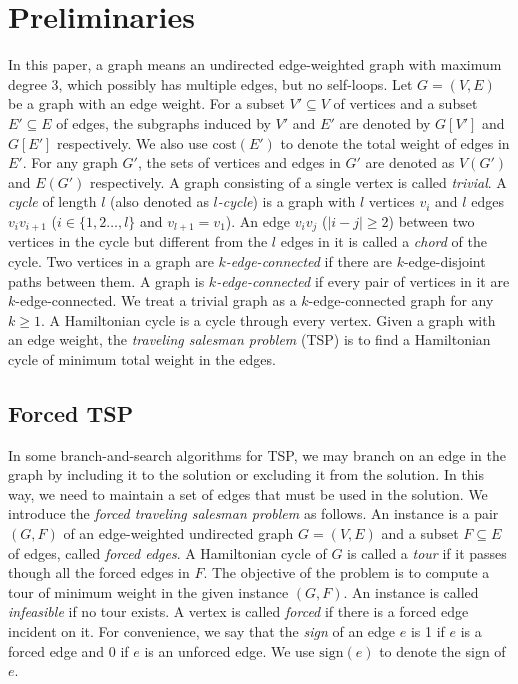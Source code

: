 \documentclass[runningheads]{llncs}
\begin{document}
\section{Preliminaries}\label{sec:prelim}

In this paper, a graph means an undirected edge-weighted graph with maximum degree 3,
which possibly has multiple edges, but no self-loops.
Let $G=(V,E)$ be a graph with an edge weight.
For a subset $V'\subseteq V$ of vertices and a subset $E'\subseteq E$ of edges,
the subgraphs induced by $V'$ and $E'$ are denoted by $G[V']$ and $G[E']$ respectively. We also use  $\mathrm{cost}(E')$ to denote the total weight of edges in $E'$.
For any graph $G'$, the sets of vertices
and edges in $G'$ are denoted as $V(G')$ and $E(G')$ respectively.
A graph consisting of a single vertex is called {\em trivial}.
A \emph{cycle} of length $l$ (also denoted as {\em $l$-cycle}) is a graph with $l$ vertices $v_i$ and $l$ edges $v_iv_{i+1}$ ($i\in \{1,2\dots,l\}$ and $v_{l+1}=v_1$). An edge $v_iv_j$ ($|i-j|\geq 2$) between two vertices in the cycle but different from the $l$ edges in it
is called a {\em chord} of the cycle.
Two vertices in a graph are
{\em $k$-edge-connected} if there are $k$-edge-disjoint paths between them. A graph is {\em $k$-edge-connected} if every pair of vertices in it are $k$-edge-connected.
We treat a trivial graph as a $k$-edge-connected graph for any $k\geq 1$.
A Hamiltonian cycle is a cycle through every vertex. Given a graph with an edge weight,
the \emph{traveling salesman problem} (TSP) is to find a Hamiltonian cycle of minimum total weight in the edges.

\subsection{Forced TSP}
In some branch-and-search algorithms for TSP, we may branch on an edge in the graph by including it to the solution
or excluding it from the solution. In this way, we need to maintain a set of edges that must be used in the solution.
We introduce the \emph{forced traveling salesman problem} as follows. An instance is a pair $(G,F)$ of an edge-weighted undirected graph
$G=(V,E)$ and
a subset $F\subseteq E$ of edges, called {\em forced edges}.
A Hamiltonian cycle of $G$ is called a {\em tour}
if it passes though all the forced edges in $F$. The objective of the problem is to compute a tour of minimum weight in
the given instance $(G,F)$. An instance is called {\em infeasible} if no tour exists. A vertex is called \emph{forced} if there is a forced edge incident on it. For convenience, we say that the \emph{sign} of an edge $e$ is 1 if $e$ is a forced edge and $0$ if $e$ is an unforced edge. We use $\mathrm{sign}(e)$ to denote the sign of $e$.
\end{document}
